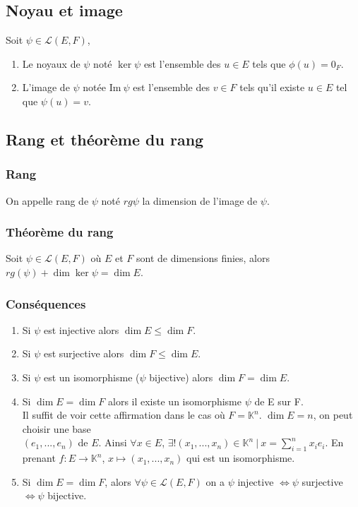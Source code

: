 \documentclass[a4paper,10pt]{book} %
\newcommand{\K}{\mathbb{K}}
\newcommand{\tq}{~|~}
\newcommand{\Ima}{\mathrm{Im}~} %
\begin{document}
\subsection{Noyau et image}
Soit $\psi \in \mathcal{L}(E,F)$, 
\begin{enumerate}
\item Le noyaux de $\psi$ noté $\ker \psi$ est l'ensemble des $u\in E$ tels que $\phi(u)=0_F$.
\item L'image de $\psi$ notée $\Ima \psi$ est l'ensemble des $v\in F$ tels qu'il existe $u\in E$ tel que $\psi(u)=v$.
\end{enumerate}

\subsection{Rang et théorème du rang}
\subsubsection{Rang}
On appelle rang de $\psi$ noté $rg \psi$ la dimension de l'image de $\psi$.

\subsubsection{Théorème du rang}
Soit $\psi \in \mathcal{L}(E,F)$ où $E$ et $F$ sont de dimensions finies, alors $rg(\psi)+\dim \ker \psi=\dim E$.

\subsubsection{Conséquences}
\begin{enumerate}
\item Si $\psi$ est injective alors $\dim E\leq \dim F$.
\item Si $\psi$ est surjective alors $\dim F \leq \dim E$.
\item Si $\psi$ est un isomorphisme ($\psi$ bijective) alors $\dim F=\dim E$.
\item Si $\dim E=\dim F$ alors il existe un isomorphisme $\psi$ de E sur F.\\
Il suffit de voir cette affirmation dans le cas où $F=\K^n$. $\dim E=n$, on peut choisir une base\\
$(e_1,...,e_n)$ de $E$. Ainsi $\forall x\in E$, $\exists! (x_1,...,x_n)\in \K^n \tq x=\sum_{i=1}^nx_ie_i$. En prenant $f: E\rightarrow  \K^n$, $x\mapsto (x_1,...,x_n)$ qui est un isomorphisme.
\item Si $\dim E=\dim F$, alors $\forall \psi\in \mathcal{L}(E,F)$ on a $\psi$ injective $\Leftrightarrow \psi$ surjective $\Leftrightarrow \psi$ bijective.
\end{enumerate}
\end{document}
